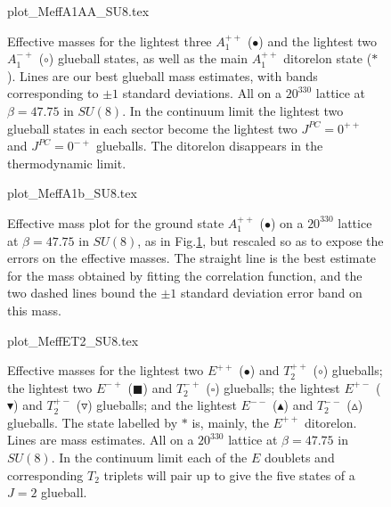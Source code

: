 \documentclass[12pt]{article}
\begin{document}
\begin{figure}[htb]
\begin	{center}
\leavevmode
	{plot_MeffA1AA_SU8.tex}
\end	{center}
\caption{Effective masses for the lightest three $A_1^{++}$ ($\bullet$) and the lightest
  two $A_1^{-+}$ ($\circ$) glueball states, as well as the main $A_1^{++}$ ditorelon state ($\ast$).
  Lines are our best glueball mass estimates, with bands corresponding to $\pm 1$ standard deviations.
  All on a $20^330$ lattice at $\beta=47.75$ in $SU(8)$.
  In the continuum limit the lightest two glueball states in each sector become the lightest
  two $J^{PC}=0^{++}$ and $J^{PC}=0^{-+}$ glueballs. The ditorelon disappears in the thermodynamic
  limit.}
\label{fig_MeffA1_SU8}
\end{figure}


\begin{figure}[htb]
\begin	{center}
\leavevmode
	{plot_MeffA1b_SU8.tex}
\end	{center}
\caption{Effective mass plot for the ground state $A_1^{++}$ ($\bullet$) 
  on a $20^330$ lattice at $\beta=47.75$ in $SU(8)$, as in Fig.\ref{fig_MeffA1_SU8},
  but rescaled so as to expose the errors on the effective masses. The straight line
  is the best estimate for the mass obtained by fitting the correlation function, and
  the two dashed lines bound the $\pm 1$ standard deviation error band on this mass.}
\label{fig_MeffA1b_SU8}
\end{figure}


\begin{figure}[htb]
\begin	{center}
\leavevmode
	{plot_MeffET2_SU8.tex}
\end	{center}
\caption{Effective masses for the lightest two $E^{++}$ ($\bullet$) and $T_2^{++}$ ($\circ$) 
  glueballs; the lightest two  $E^{-+}$ ($\blacksquare$) and $T_2^{-+}$ ($\square$) glueballs;
  the lightest $E^{+-}$ ($\blacktriangledown$) and $T_2^{+-}$ ($\triangledown$) glueballs;
  and the lightest $E^{--}$ ($\blacktriangle$) and $T_2^{--}$ ($\vartriangle$) glueballs.
  The state labelled by $\ast$ is, mainly, the $E^{++}$ ditorelon.
  Lines are mass estimates. All on a $20^330$ lattice at $\beta=47.75$ in $SU(8)$.
  In the continuum limit each of the $E$ doublets and corresponding $T_2$ triplets will
  pair up to give the five states of a $J=2$ glueball.}
\label{fig_MeffET2_SU8}
\end{figure}
\end{document}
